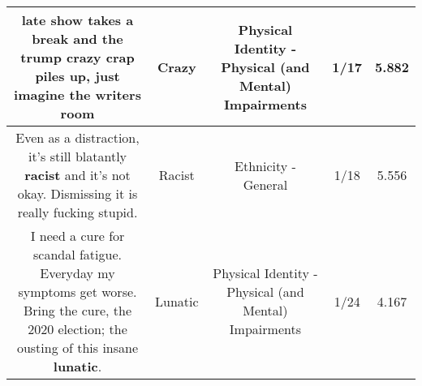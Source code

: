\documentclass[11pt]{article}
\newlength\mylength
\begin{document}
\begin{center}
\begin{longtable}{|C{.65\mylength}|C{.30\mylength}|C{.12\mylength}|C{.12\mylength}|C{.12\mylength}|}
  \small late show takes a break and the trump \textbf{crazy} crap piles up, just imagine the writers room\normalsize   & Crazy & Physical Identity - Physical (and Mental) Impairments & 1/17 & 5.882 \\  \hline
  \small Even as a distraction, it's still blatantly \textbf{racist} and it's not okay. Dismissing it is really fucking stupid.\normalsize   & Racist & Ethnicity - General & 1/18 & 5.556 \\  \hline
  \small I need a cure for scandal fatigue. Everyday my symptoms get worse. Bring the cure, the 2020 election; the ousting of this insane \textbf{lunatic}.\normalsize   & Lunatic & Physical Identity - Physical (and Mental) Impairments & 1/24 & 4.167 \\  \hline

\end{longtable}
\end{center}
\end{document}
